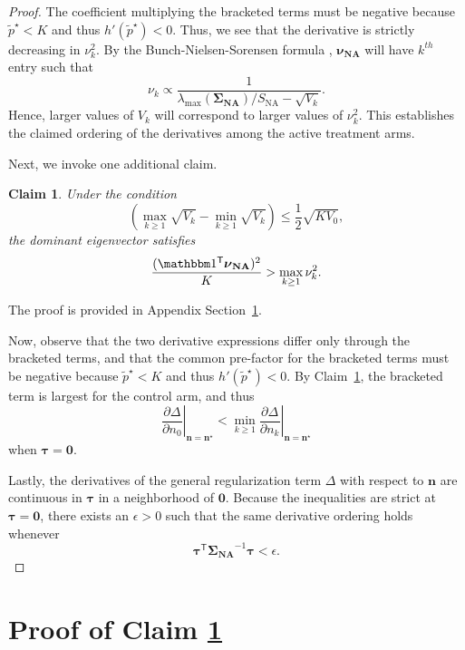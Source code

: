 \documentclass{article}
\newcommand{\bsSigmaN}{\boldsymbol {\Sigma_{\textbf{NA}}}}
\newcommand{\bstau}{\boldsymbol \tau}
\newcommand{\bsnu}{\boldsymbol \nu_{\textbf{NA}}}
\newcommand{\bsn}{\boldsymbol n}
\newtheorem{claim}{Claim}
\newcommand{\tran}{\mathsf{T}}
\newcommand{\lambdamaxn}{\lambda_{\text{max}}(\bsSigmaN)}
\newcommand{\sna}{S_{\text{NA}}}
\begin{document}
\begin{proof}
The coefficient multiplying the bracketed terms must be negative because $\tilde p^\star < K$ and thus $h'(\tilde p^\star) < 0$. Thus, we see that the derivative is strictly decreasing in $\nu_k^2$. By the Bunch-Nielsen-Sorensen formula \citep{bunch1978rank}, $\bsnu$ will have $k^{th}$ entry such that 
\[\nu_k \propto \frac{1}{\lambdamaxn/\sna-\sqrt{V_k}}.\] 
Hence, larger values of $V_k$ will correspond to larger values of $\nu_k^2$. This establishes the claimed ordering of the derivatives among the active treatment arms.

Next, we invoke one additional claim.
\begin{claim}\label{claim:bockMinAlloc}
Under the condition
\[ \left(\max_{k\geq1}\sqrt{V_k}-\min_{k\geq1}\sqrt{V_k} \right) \leq \frac{1}{2}\sqrt{KV_0}, \]
the dominant eigenvector satisfies
\[ \frac{(\mathbbm 1^\tran\bsnu)^2}{K}>\max_{k\geq1}\nu_k^2. \]
\end{claim}
\noindent The proof is provided in Appendix Section~\ref{sec:proof_bockMinAlloc}.

Now, observe that the two derivative expressions differ only through the bracketed terms, and that the common pre-factor for the bracketed terms must be negative because $\tilde p^\star < K$ and thus $h'(\tilde p^\star) < 0$. By Claim~\ref{claim:bockMinAlloc}, the bracketed term is largest for the control arm, and thus 
\[ \left.\frac{\partial\Delta}{\partial n_0}\right|_{\bsn=\bsn^\star}<\min_{k\geq1}\left.\frac{\partial\Delta}{\partial n_k}\right|_{\bsn=\bsn^\star} \]
when $\bstau=\boldsymbol 0$.

Lastly, the derivatives of the general regularization term $\Delta$
with respect to $\bsn$ are continuous in $\bstau$ in a neighborhood of
$\boldsymbol 0$. Because the inequalities are strict at $\bstau=\boldsymbol 0$,
there exists an $\epsilon>0$ such that the same derivative ordering holds whenever
\[ \bstau^\tran\bsSigmaN^{-1}\bstau < \epsilon.\]
\end{proof}

\section{Proof of Claim \ref{claim:bockMinAlloc}}\label{sec:proof_bockMinAlloc}
\end{document}
